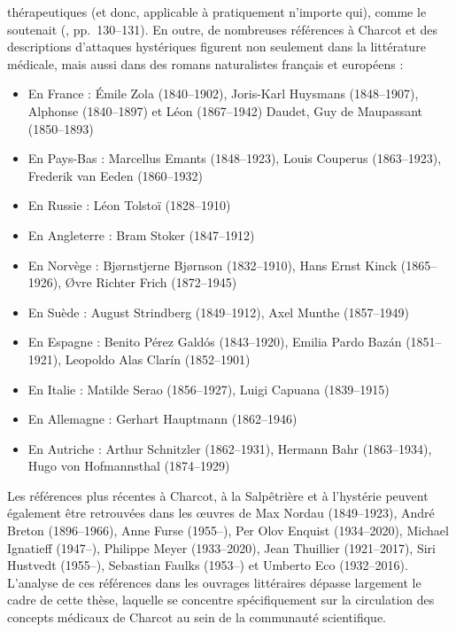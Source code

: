 thérapeutiques (et donc, applicable à pratiquement n'importe qui), comme le soutenait \citeauthor{bernheim1891suggestion} (\citeyear{bernheim1891suggestion}, pp.~130--131). En outre, de nombreuses références à Charcot et des descriptions d'attaques hystériques figurent non seulement dans la littérature médicale, mais aussi dans des romans naturalistes français et européens \citep{KOEHLER201393} :
\begin{itemize}
	\item En France : Émile Zola (1840--1902), Joris-Karl Huysmans (1848--1907), Alphonse (1840--1897) et Léon (1867--1942) Daudet, Guy de Maupassant (1850--1893)
	\item En Pays-Bas : Marcellus Emants (1848--1923), Louis Couperus (1863--1923), Frederik van Eeden (1860--1932)
	\item En Russie : Léon Tolstoï (1828--1910)
	\item En Angleterre : Bram Stoker (1847--1912)
	\item En Norvège : Bj{\o}rnstjerne Bj{\o}rnson (1832--1910), Hans Ernst Kinck (1865--1926), {\O}vre Richter Frich (1872--1945)
	\item En Suède : August Strindberg (1849--1912), Axel Munthe (1857--1949)
	\item En Espagne : Benito Pérez Gald\'{o}s (1843--1920), Emilia Pardo Baz\'{a}n (1851--1921), Leopoldo Alas Clar\'{i}n (1852--1901)
	\item En Italie : Matilde Serao (1856--1927), Luigi Capuana (1839--1915)
	\item En Allemagne : Gerhart Hauptmann (1862--1946)
	\item En Autriche : Arthur Schnitzler (1862--1931), Hermann Bahr (1863--1934), Hugo von Hofmannsthal (1874--1929)
\end{itemize} 

Les références plus récentes à Charcot, à la Salpêtrière et à l'hystérie peuvent également être retrouvées dans les \oe{}uvres de Max Nordau (1849--1923), André Breton (1896--1966), Anne Furse (1955--), Per Olov Enquist (1934--2020), Michael Ignatieff (1947--), Philippe Meyer (1933--2020), Jean Thuillier (1921--2017), Siri Hustvedt (1955--), Sebastian Faulks (1953--) et Umberto Eco (1932--2016). L'analyse de ces références dans les ouvrages littéraires dépasse largement le cadre de cette thèse, laquelle se concentre spécifiquement sur la circulation des concepts médicaux de Charcot au sein de la communauté scientifique.

